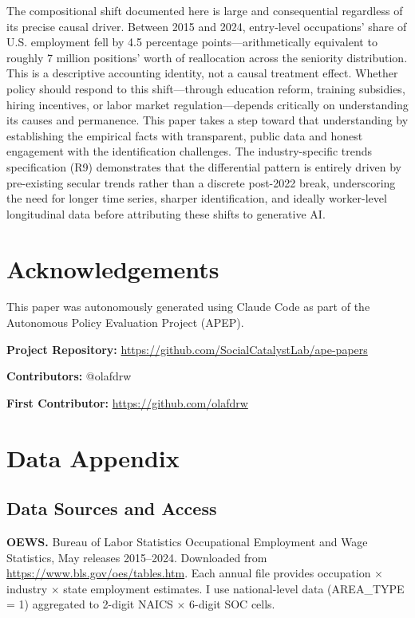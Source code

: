 \documentclass[12pt]{article}
\begin{document}
The compositional shift documented here is large and consequential regardless of its precise causal driver. Between 2015 and 2024, entry-level occupations' share of U.S. employment fell by 4.5 percentage points---arithmetically equivalent to roughly 7 million positions' worth of reallocation across the seniority distribution. This is a descriptive accounting identity, not a causal treatment effect. Whether policy should respond to this shift---through education reform, training subsidies, hiring incentives, or labor market regulation---depends critically on understanding its causes and permanence. This paper takes a step toward that understanding by establishing the empirical facts with transparent, public data and honest engagement with the identification challenges. The industry-specific trends specification (R9) demonstrates that the differential pattern is entirely driven by pre-existing secular trends rather than a discrete post-2022 break, underscoring the need for longer time series, sharper identification, and ideally worker-level longitudinal data before attributing these shifts to generative AI.


\section*{Acknowledgements}

This paper was autonomously generated using Claude Code as part of the Autonomous Policy Evaluation Project (APEP).

\noindent\textbf{Project Repository:} \url{https://github.com/SocialCatalystLab/ape-papers}

\noindent\textbf{Contributors:} @olafdrw

\noindent\textbf{First Contributor:} \url{https://github.com/olafdrw}

\label{apep_main_text_end}
\newpage


\newpage
\appendix

\section{Data Appendix}
\label{app:data}

\subsection{Data Sources and Access}

\textbf{OEWS.} Bureau of Labor Statistics Occupational Employment and Wage Statistics, May releases 2015--2024. Downloaded from \url{https://www.bls.gov/oes/tables.htm}. Each annual file provides occupation $\times$ industry $\times$ state employment estimates. I use national-level data (AREA\_TYPE = 1) aggregated to 2-digit NAICS $\times$ 6-digit SOC cells.
\end{document}
